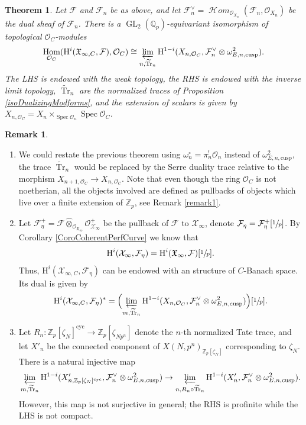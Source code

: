 \documentclass[JEP,XML,SOM,Unicode,published]{cedram}
\newcommand{\cusp}{\mathrm{cusp}}
\newcommand{\cyc}{\mathrm{cyc}}
\newcommand{\wotimes}{\mathbin{\widehat\otimes}}
\numberwithin{equation}{section}
\newtheorem{theo}[prop]{Theorem}
\theoremstyle{definition}
\newtheorem{remark}[prop]{Remark}
\newcommand{\bb}[1]{\mathbb{#1}}
\newcommand{\n}[1]{\mathcal{#1}}
\newcommand{\f}[1]{\mathfrak{#1}}
\newcommand{\s}[1]{\mathscr{#1}}
\DeclareMathOperator{\GL}{GL}
\DeclareMathOperator{\Tr}{Tr}
\DeclareMathOperator{\Hom}{Hom}
\DeclareMathOperator{\Spec}{Spec}
\DeclareMathOperator{\sHom}{\s{H}\!\mathit{om}}
\begin{document}
\begin{theo}
\label{TheoDualityinfinite}
Let $\n{F}$ and $\n{F}_n$ be as above, and let $\n{F}_n^\vee= \sHom_{\s{O}_{X_n}}(\n{F}_n, \s{O}_{X_n})$ be the dual sheaf of $\n{F}_n$. There is a $\GL_2(\bb{Q}_p)$-equivariant isomorphism of topological $\n{O}_C$-modules
\begin{equation}
\label{eqInftyduality}
\Hom_{\n{O}_C}(\mathrm{H}^i (\f{X}_{\infty,C}, \n{F}), \n{O}_C) \cong \varprojlim_{n, \widetilde{\Tr}_n} \mathrm{H}^{1-i}(X_{n,\n{O}_C}, \n{F}_n^{\vee} \otimes \omega^2_{E,n,\cusp}).
\end{equation}
The LHS is endowed with the weak topology, the RHS is endowed with the inverse limit topology, $\widetilde{\Tr}_n$ are the normalized traces of Proposition \ref{isoDualizingModforms}, and the extension of scalars is given by $X_{n,\n{O}_C}=X_{n}\times_{\Spec \n{O}_n} \Spec \n{O}_C$.
\end{theo}

\skpt
\begin{remark}
\label{RemarkDualityinfty}
\begin{enumerate}

\item\label{RemarkDualityinfty1}
We could restate the previous theorem using $\omega^{\circ}_{n}= \pi_n^! \n{O}_n$ instead of $\omega^2_{E,n,\cusp}$, the trace $\widetilde{\Tr}_n$ would be replaced by the Serre duality trace relative to the morphism $X_{n+1, \n{O}_C}\to X_{n,\n{O}_C}$. Note that even though the ring $\n{O}_C$ is not noetherian, all the objects involved are defined as pullbacks of objects which live over a finite extension of $\bb{Z}_p$, see Remark \ref{remark1}.

\item\label{RemarkDualityinfty2}
Let $\n{F}^+_{\eta}= \n{F}\wotimes_{\s{O}_{\f{X}_{\infty}}} \s{O}^+_{\n{X}_{\infty}}$ be the pullback of $\n{F}$ to $\n{X}_{\infty}$, denote $\n{F}_{\eta}= \n{F}^+_{\eta}[\sfrac{1}{p}]$. By Corollary \ref{CoroCoherentPerfCurve} we know that
\[
\mathrm{H}^i(\n{X}_{\infty}, \n{F}_{\eta}) = \mathrm{H}^i(\f{X}_{\infty}, \n{F})[\sfrac{1}{p}].
\]
Thus, $\mathrm{H}^i(\n{X}_{\infty,C}, \n{F}_{\eta}) $ can be endowed with an structure of $C$-Banach space. Its dual is given by
\[
\mathrm{H}^i(\n{X}_{\infty, C}, \n{F}_{\eta})^* = \Bigl(\varprojlim_{m, \widetilde{\Tr}_n} \mathrm{H}^{1-i}(X_{n,\n{O}_C}, \n{F}_n^\vee \otimes \omega^2_{E,n,\cusp})\Bigr)[\sfrac{1}{p}].
\]

\item\label{RemarkDualityinfty3}
Let $R_n: \bb{Z}_p[\zeta_{N}]^{\cyc}\to \bb{Z}_p[\zeta_{Np^n}]$ denote the $n$-th normalized Tate trace, and let $X'_n$ be the connected component of $X(N,p^n)_{\bb{Z}_p[\zeta_{N}]}$ corresponding to $\zeta_N$. There is a natural injective map
\[
\varprojlim_{m , \widetilde{\Tr}_n} \mathrm{H}^{1-i}(X'_{n,\bb{Z}_p[\zeta_N]^{\cyc}}, \n{F}_n^\vee \otimes \omega^2_{E,n,\cusp}) \to \varprojlim_{n, R_n\circ \widetilde{\Tr}_n} \mathrm{H}^{1-i}(X'_{n}, \n{F}_n^\vee \otimes \omega^2_{E,n,\cusp}).
\]
However, this map is not surjective in general; the RHS is profinite while the LHS is not compact.
\end{enumerate}
\end{remark}
\end{document}
